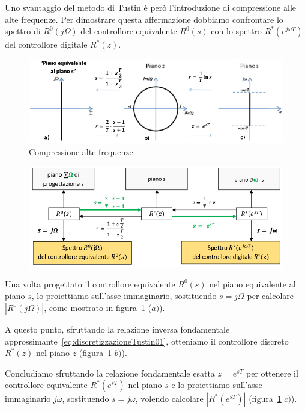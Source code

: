 \documentclass[a4paper]{report}
\begin{document}
Uno svantaggio del metodo di Tustin \`e per\`o l'introduzione di
compressione alle alte frequenze. Per dimostrare
questa affermazione dobbiamo confrontare lo spettro di $R^{0}(j
\Omega)$ del controllore equivalente $R^{0}(s)$ con lo spettro
$R^{*}(e^{j \omega T})$ del controllore digitale $R^{*}(z)$.
\begin{figure}[!h]
  \begin{center}
    \includegraphics[scale=0.4]{./figures/discretizzazioneTustin02.png}
    \caption{Compressione alte
      frequenze}\label{fig:discretizzazioneTustin02}
  \end{center}
\end{figure}
\begin{figure}[!h]
  \begin{center}
    \includegraphics[scale=0.4]{./figures/discretizzazioneTustin03.png}
    \caption{}\label{fig:discretizzazioneTustin03}
  \end{center}
\end{figure}
Una volta progettato il controllore equivalente $R^{0}(s)$ nel piano
equivalente al piano $s$, lo proiettiamo sull'asse immaginario,
sostituendo $s = j \Omega$ per calcolare $|R^{0}(j \Omega)|$, come
mostrato in figura~\ref{fig:discretizzazioneTustin02} ($a)$).

A questo punto, sfruttando la relazione inversa fondamentale
approssimante~\ref{eq:discretizzazioneTustin01}, otteniamo il
controllore discreto $R^{*}(z)$ nel piano $z$
(figura~\ref{fig:discretizzazioneTustin02} $b)$).

Concludiamo sfruttando la relazione fondamentale esatta $z = e^{sT}$
per ottenere il controllore equivalente $R^{*}(e^{sT})$ nel piano $s$
e lo proiettiamo sull'asse immaginario $j \omega$, sostituendo $s = j
\omega$, volendo calcolare $|R^{*}(e^{sT})|$
(figura~\ref{fig:discretizzazioneTustin02} $c)$).
\end{document}
